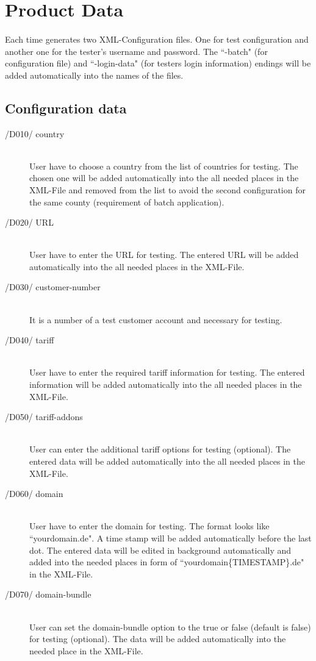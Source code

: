 \section{Product Data}
\paragraph{}Each time \app{} generates two XML-Configuration files. One for test configuration and another one for the tester's username and password. The ``-batch" (for configuration file) and ``-login-data" (for testers login information) endings will be added automatically into the names of the files.

\subsection{Configuration data}
\begin{description}
\item[/D010/ country]\hfill \\ User have to choose a country from the list of countries for testing. The chosen one will be added automatically into the all needed places in the XML-File and removed from the list to avoid the second configuration for the same county (requirement of batch application).
\item[/D020/ URL]\hfill \\ User have to enter the URL for testing. The entered URL will be added automatically into the all needed places in the XML-File.
\item[/D030/ customer-number]\hfill \\ It is a number of a test customer account and necessary for testing.
\item[/D040/ tariff]\hfill \\ User have to enter the required tariff information for testing. The entered information will be added automatically into the all needed places in the XML-File.
\item[/D050/ tariff-addons]\hfill \\ User can enter the additional tariff options for testing (optional). The entered data will be added automatically into the all needed places in the XML-File.
\item[/D060/ domain]\hfill \\ User have to enter the domain for testing. The format looks like ``yourdomain.de". A time stamp will be added automatically before the last dot. The entered data will be edited in background automatically and added into the needed places in form of ``yourdomain\{TIMESTAMP\}.de"  in the XML-File.
\item[/D070/ domain-bundle]\hfill \\ User can set the domain-bundle option to the true or false (default is false) for testing (optional). The data will be added automatically into the needed place in the XML-File.
\end{description}

